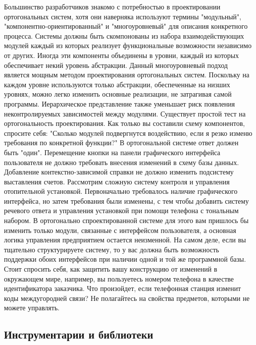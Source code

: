 Большинство разработчиков знакомо с потребностью в проектировании ортогональных
систем, хотя они наверняка используют термины "модульный",
"компонентно-ориентированный" и "многоуровневый" для описания конкретного
процесса. Системы должны быть скомпонованы из набора взаимодействующих модулей
каждый из которых реализует функциональные возможности независимо от других.
Иногда эти компоненты объединены в уровни, каждый из которых обеспечивает некий
уровень абстракции. Данный многоуровневый подход является мощным методом
проектирования ортогональных систем. Поскольку на каждом уровне используются
только абстракции, обеспеченные на низших уровнях, можно легко изменить основные
реализации, не затрагивая самой программы. Иерархическое представление также
уменьшает риск появления неконтролируемых зависимостей между модулями.
Существует простой тест на ортогональность проектирования. Как только вы
составили схему компонентов, спросите себя: "Сколько модулей подвергнутся
воздействию, если я резко изменю требования по конкретной функции?" В
ортогональной системе ответ должен быть "один". Перемещение кнопки на панели
графического интерфейса пользователя не должно требовать внесения изменений в
схему базы данных. Добавление контекстно-зависимой справки не должно изменить
подсистему выставления счетов. Рассмотрим сложную систему контроля и управления
отопительной установкой. Первоначально требовалось наличие графического
интерфейса, но затем требования были изменены, с тем чтобы добавить систему
речевого ответа и управления установкой при помощи телефона с тональным набором.
В ортогонально спроектированной системе для этого вам пришлось бы изменить
только модули, связанные с интерфейсом пользователя, а основная логика
управления предприятием остается неизменной. На самом деле, если вы тщательно
структурируете систему, то у вас должна быть возможность поддержки обоих
интерфейсов при наличии одной и той же программной базы. Стоит спросить себя,
как защитить вашу конструкцию от изменений в окружающем мире, например, вы
пользуетесь номером телефона в качестве идентификатора заказчика. Что
произойдет, если телефонная станция изменит коды междугородней связи? Не
полагайтесь на свойства предметов, которыми не можете управлять.

\subsection{Инструментарии и библиотеки}

